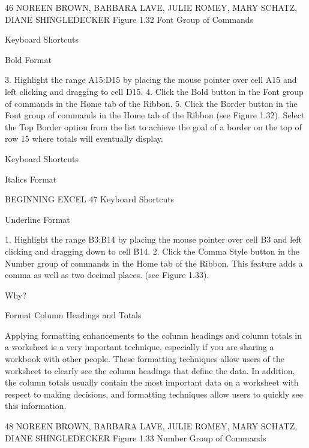 46 NOREEN BROWN, BARBARA LAVE, JULIE ROMEY, MARY SCHATZ, DIANE SHINGLEDECKER
Figure 1.32 Font Group of Commands




Keyboard Shortcuts


Bold Format




3. Highlight the range A15:D15 by placing the mouse pointer over cell A15 and left clicking and
dragging to cell D15.
4. Click the Bold button in the Font group of commands in the Home tab of the Ribbon.
5. Click the Border button in the Font group of commands in the Home tab of the Ribbon
(see Figure 1.32). Select the Top Border option from the list to achieve the goal of a border on
the top of row 15 where totals will eventually display.


Keyboard Shortcuts


Italics Format





BEGINNING EXCEL 47
Keyboard Shortcuts


Underline Format





1. Highlight the range B3:B14 by placing the mouse pointer over cell B3 and left clicking and
dragging down to cell B14.
2. Click the Comma Style button in the Number group of commands in the Home tab of the
Ribbon. This feature adds a comma as well as two decimal places. (see Figure 1.33).




Why?

Format Column Headings and Totals

Applying formatting enhancements to the column headings and column totals in a worksheet is a very important
technique, especially if you are sharing a workbook with other people. These formatting techniques allow users of
the worksheet to clearly see the column headings that define the data. In addition, the column totals usually contain
the most important data on a worksheet with respect to making decisions, and formatting techniques allow users
to quickly see this information.




48 NOREEN BROWN, BARBARA LAVE, JULIE ROMEY, MARY SCHATZ, DIANE SHINGLEDECKER
Figure 1.33 Number Group of Commands


